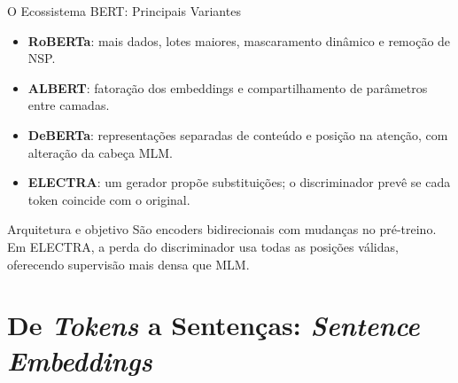 \documentclass[aspectratio=169, xcolor=dvipsnames]{beamer}
\begin{document}
  \begin{frame}{O Ecossistema BERT: Principais Variantes}
    \begin{itemize}\small
      \item \textbf{RoBERTa}\cite{liu2019roberta}: mais dados, lotes maiores,
      mascaramento dinâmico e remoção de NSP.
      \item \textbf{ALBERT}\cite{lan2020albert}: fatoração dos embeddings
      e compartilhamento de parâmetros entre camadas.
      \item \textbf{DeBERTa}\cite{he2021deberta}: representações separadas
      de conteúdo e posição na atenção, com alteração da cabeça MLM.
      \item \textbf{ELECTRA}\cite{clark2020electra}: um gerador propõe
      substituições; o discriminador prevê se cada token coincide com o original.
    \end{itemize}
    \begin{block}{Arquitetura e objetivo}
      São encoders bidirecionais com mudanças no pré-treino.
      Em ELECTRA, a perda do discriminador usa todas as posições válidas,
      oferecendo supervisão mais densa que MLM.
    \end{block}
  \end{frame}

  \section{De \textit{Tokens} a Sentenças: \textit{Sentence Embeddings}}
\end{document}
